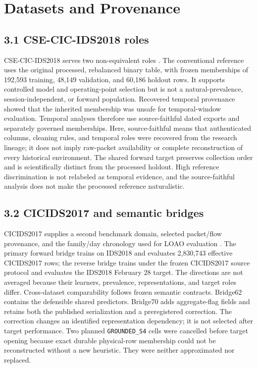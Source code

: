 \documentclass[preprint,12pt]{elsarticle}
\begin{document}
\section{Datasets and Provenance}

\subsection{3.1 CSE-CIC-IDS2018 roles}
CSE-CIC-IDS2018 serves two non-equivalent roles \cite{cse_cic_ids2018_official, sharafaldin2018toward}. The conventional reference uses the original processed, rebalanced binary table, with frozen memberships of 192,593 training, 48,149 validation, and 60,186 holdout rows. It supports controlled model and operating-point selection but is not a natural-prevalence, session-independent, or forward population.
Recovered temporal provenance showed that the inherited membership was unsafe for temporal-window evaluation. Temporal analyses therefore use source-faithful dated exports and separately governed memberships. Here, source-faithful means that authenticated columns, cleaning rules, and temporal roles were recovered from the research lineage; it does not imply raw-packet availability or complete reconstruction of every historical environment. The shared forward target preserves collection order and is scientifically distinct from the processed holdout. High reference discrimination is not relabeled as temporal evidence, and the source-faithful analysis does not make the processed reference naturalistic.

\subsection{3.2 CICIDS2017 and semantic bridges}
CICIDS2017 supplies a second benchmark domain, selected packet/flow provenance, and the family/day chronology used for LOAO evaluation \cite{cicids2017_official, sharafaldin2018toward}. The primary forward bridge trains on IDS2018 and evaluates 2,830,743 effective CICIDS2017 rows; the reverse bridge trains under the frozen CICIDS2017 source protocol and evaluates the IDS2018 February 28 target. The directions are not averaged because their learners, prevalence, representations, and target roles differ.
Cross-dataset comparability follows frozen semantic contracts. Bridge62 contains the defensible shared predictors. Bridge70 adds aggregate-flag fields and retains both the published serialization and a preregistered correction. The correction changes an identified representation dependency; it is not selected after target performance. Two planned \texttt{GROUNDED\_S4} cells were cancelled before target opening because exact durable physical-row membership could not be reconstructed without a new heuristic. They were neither approximated nor replaced.
\end{document}
